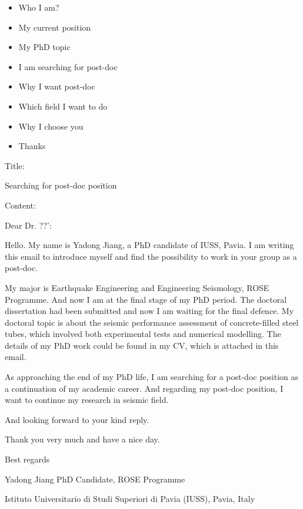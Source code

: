 \documentclass[a4paper]{article}
\begin{document}
\begin{itemize}
	\item Who I am?
	\item My current position
	\item My PhD topic
	\item I am searching for post-doc
	\item Why I want post-doc
	\item Which field I want to do
	\item Why I choose you
	\item Thanks
\end{itemize}




Title:

Searching for post-doc position

Content:

Dear Dr. ??':

Hello. My name is Yadong Jiang, a PhD candidate of IUSS, Pavia. I am writing this email to introduce myself and find the possibility to work in your group as a post-doc.

My major is Earthquake Engineering and Engineering Seismology, ROSE Programme. And now I am at the final stage of my PhD period. The doctoral dissertation had been submitted and now I am waiting for the final defence. My doctoral topic is about the seismic performance assessment of concrete-filled steel tubes, which involved both experimental tests and numerical modelling. The details of my PhD work could be found in my CV, which is attached in this email. 

As approaching the end of my PhD life, I am searching for a post-doc position as a continuation of my academic career. And regarding my post-doc position, I want to continue my research in seismic field. 

And looking forward to your kind reply.

Thank you very much and have a nice day.

Best regards

Yadong Jiang
PhD Candidate, ROSE Programme

Istituto Universitario di Studi Superiori di Pavia (IUSS), Pavia, Italy
\end{document}
